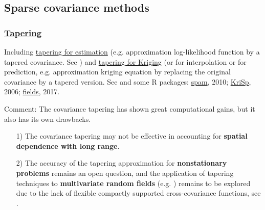 \documentclass[
12pt, %
a4paper, %
oneside, %
headinclude,footinclude, %
BCOR5mm, %
]{scrartcl}
\begin{document}
\subsection{Sparse covariance methods}
\subsubsection{\href{https://user.math.uzh.ch/furrer/software/KriSp/}{Tapering}}
Including \href{https://chenyw68.github.io/Literature/[2008]Covariance Tapering for Likelihood Based Estimation in Large Spatial Data Sets.pdf}{tapering for estimation} (e.g. approximation log-likelihood function by a tapered covariance. See \href{https://chenyw68.github.io/Literature/[2008]Covariance Tapering for Likelihood Based Estimation in Large Spatial Data Sets.pdf}{\cite{kaufman2008covariance}}) and \href{https://chenyw68.github.io/Literature/[2006]Covariance tapering for interpolation of large spatial datasets.pdf}{tapering for Kriging} (or for interpolation or for prediction, e.g. approximation kriging equation by replacing the original covariance by a tapered version. See \href{https://chenyw68.github.io/Literature/[2006]Covariance tapering for interpolation of large spatial datasets.pdf}{\cite{furrer2006covariance}} and some R packages: \href{https://chenyw68.github.io/Literature/[2010]spam-A Sparse Matrix R Package with Emphasis on MCMC Methods for Gaussian Markov Random Fields.pdf}{spam}, 2010; \href{https://chenyw68.github.io/Literature/[2006]KriSp.pdff}{KriSp}, 2006; \href{https://chenyw68.github.io/Literature/[2020]fields.pdf}{fields}, 2017.

\textcolor[rgb]{1.00,0.00,1.00}{Comment:}
The covariance tapering has shown great computational gains, but it also has its own drawbacks.
\begin{itemize}
 \item [1)]The covariance tapering may not be effective in accounting for \textbf{spatial dependence with long range}.
 \item [2)]The accuracy of the tapering approximation for \textbf{nonstationary problems} remains an open question, and the application of tapering techniques to \textbf{multivariate random fields} (e.g. \href{https://chenyw68.github.io/Literature/[2015]Covariance tapering for multivariate Gaussian random fields estimation.pdf}{\citep{bevilacqua2016covariance}}) remains to be explored due to the lack of flexible compactly supported cross-covariance functions, see \href{https://chenyw68.github.io/Literature/[2012]Advances and Challenges in Space-time Modelling of Natural Events.pdf}{\citet{porcu2012advances}}.
\end{itemize}
\end{document}
